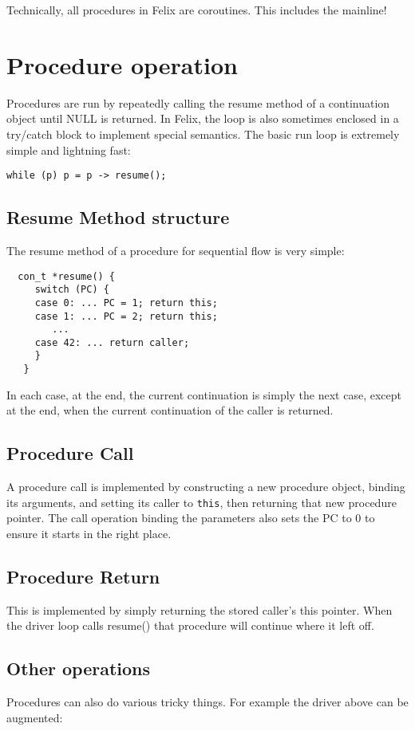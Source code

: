 \documentclass[oneside]{book}
\begin{document}
Technically, all procedures in Felix are coroutines. This includes the mainline!

\section{Procedure operation}
Procedures are run by repeatedly calling the resume method of a continuation
object until NULL is returned. In Felix, the loop is also sometimes enclosed
in a try/catch block to implement special semantics. The basic run loop is
extremely simple and lightning fast:

\begin{verbatim}
while (p) p = p -> resume();
\end{verbatim}

\subsection{Resume Method structure}
The resume method of a procedure for sequential flow is very simple:
\begin{verbatim}
  con_t *resume() {
     switch (PC) {
     case 0: ... PC = 1; return this;
     case 1: ... PC = 2; return this;
        ...
     case 42: ... return caller;
     }
   }
\end{verbatim}

In each case, at the end, the current continuation is simply the next case,
except at the end, when the current continuation of the caller is returned.

\subsection{Procedure Call}
A procedure call is implemented by constructing a new procedure object,
binding its arguments, and setting its caller to \verb$this$, then returning
that new procedure pointer. The call operation binding the parameters
also sets the PC to 0 to ensure it starts in the right place.

\subsection{Procedure Return}
This is implemented by simply returning the stored caller's this pointer.
When the driver loop calls resume() that procedure will continue where it left off.

\subsection{Other operations}
Procedures can also do various tricky things. For example the driver above
can be augmented:
\end{document}
